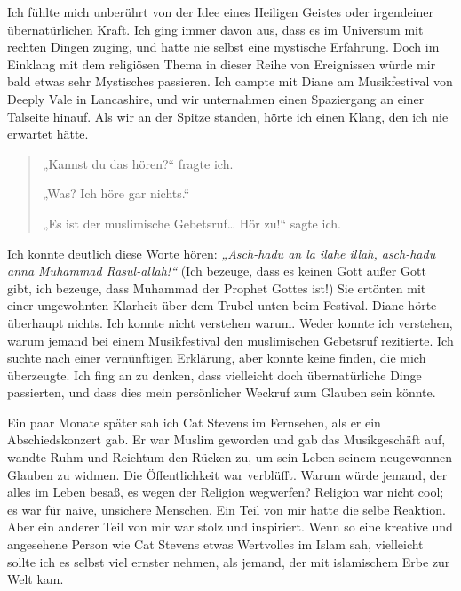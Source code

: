 \documentclass[12pt]{memoir}
\begin{document}
Ich fühlte mich unberührt von der Idee eines Heiligen Geistes
oder irgendeiner übernatürlichen Kraft.
Ich ging immer davon aus, dass es im Universum mit rechten Dingen zuging,
und hatte nie selbst eine mystische Erfahrung.
Doch im Einklang mit dem religiösen Thema in dieser Reihe von Ereignissen
würde mir bald etwas sehr Mystisches passieren.
Ich campte mit Diane am Musikfestival von Deeply Vale in Lancashire,
und wir unternahmen einen Spaziergang an einer Talseite hinauf.
Als wir an der Spitze standen, hörte ich einen Klang,
den ich nie erwartet hätte.

\begin{quote}
„Kannst du das hören?“ fragte ich.

„Was? Ich höre gar nichts.“

„Es ist der muslimische Gebetsruf… Hör zu!“ sagte ich.
\end{quote}

Ich konnte deutlich diese Worte hören:
\emph{„Asch-hadu an la ilahe illah, asch-hadu anna Muhammad Rasul-allah!“}
(Ich bezeuge, dass es keinen Gott außer Gott gibt, ich bezeuge,
dass Muhammad der Prophet Gottes ist!)
Sie ertönten mit einer ungewohnten Klarheit
über dem Trubel unten beim Festival.
Diane hörte überhaupt nichts.
Ich konnte nicht verstehen warum.
Weder konnte ich verstehen, warum jemand bei einem Musikfestival
den muslimischen Gebetsruf rezitierte.
Ich suchte nach einer vernünftigen Erklärung, aber konnte keine finden,
die mich überzeugte.
Ich fing an zu denken, dass vielleicht doch übernatürliche Dinge passierten,
und dass dies mein persönlicher Weckruf zum Glauben sein könnte.

Ein paar Monate später sah ich Cat Stevens im Fernsehen,
als er ein Abschiedskonzert gab.
Er war Muslim geworden und gab das Musikgeschäft auf,
wandte Ruhm und Reichtum den Rücken zu,
um sein Leben seinem neugewonnen Glauben zu widmen.
Die Öffentlichkeit war verblüfft.
Warum würde jemand, der alles im Leben besaß, es wegen der Religion wegwerfen?
Religion war nicht cool; es war für naive, unsichere Menschen.
Ein Teil von mir hatte die selbe Reaktion.
Aber ein anderer Teil von mir war stolz und inspiriert.
Wenn so eine kreative und angesehene Person wie Cat Stevens
etwas Wertvolles im Islam sah,
vielleicht sollte ich es selbst viel ernster nehmen,
als jemand, der mit islamischem Erbe zur Welt kam.
\end{document}
